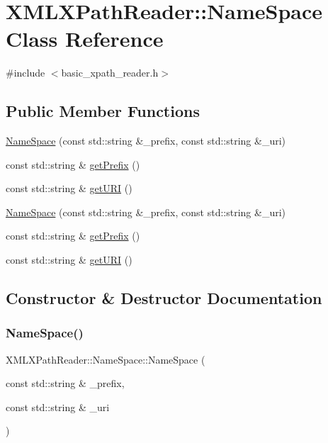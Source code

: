 \hypertarget{classXMLXPathReader_1_1NameSpace}{}\section{X\+M\+L\+X\+Path\+Reader\+:\+:Name\+Space Class Reference}
\label{classXMLXPathReader_1_1NameSpace}


{\ttfamily \#include $<$basic\+\_\+xpath\+\_\+reader.\+h$>$}

\subsection*{Public Member Functions}
\begin{DoxyCompactItemize}
\item 
\mbox{\hyperlink{classXMLXPathReader_1_1NameSpace_a66254008c400f9a4396de32654e37ac6}{Name\+Space}} (const std\+::string \&\+\_\+prefix, const std\+::string \&\+\_\+uri)
\item 
const std\+::string \& \mbox{\hyperlink{classXMLXPathReader_1_1NameSpace_a4060213f4e2b90fa3cbd3f7ab7d455a0}{get\+Prefix}} ()
\item 
const std\+::string \& \mbox{\hyperlink{classXMLXPathReader_1_1NameSpace_a4845bf9963c2687097a8265cea22e703}{get\+U\+RI}} ()
\item 
\mbox{\hyperlink{classXMLXPathReader_1_1NameSpace_a66254008c400f9a4396de32654e37ac6}{Name\+Space}} (const std\+::string \&\+\_\+prefix, const std\+::string \&\+\_\+uri)
\item 
const std\+::string \& \mbox{\hyperlink{classXMLXPathReader_1_1NameSpace_a4060213f4e2b90fa3cbd3f7ab7d455a0}{get\+Prefix}} ()
\item 
const std\+::string \& \mbox{\hyperlink{classXMLXPathReader_1_1NameSpace_a4845bf9963c2687097a8265cea22e703}{get\+U\+RI}} ()
\end{DoxyCompactItemize}


\subsection{Constructor \& Destructor Documentation}
\mbox{\label{classXMLXPathReader_1_1NameSpace_a66254008c400f9a4396de32654e37ac6}} 
\subsubsection{\texorpdfstring{NameSpace()}{NameSpace()}\hspace{0.1cm}{\footnotesize\ttfamily [1/2]}}
{\footnotesize\ttfamily X\+M\+L\+X\+Path\+Reader\+::\+Name\+Space\+::\+Name\+Space (\begin{DoxyParamCaption}\item[{const std\+::string \&}]{\+\_\+prefix,  }\item[{const std\+::string \&}]{\+\_\+uri }\end{DoxyParamCaption})\hspace{0.3cm}{\ttfamily [inline]}}


